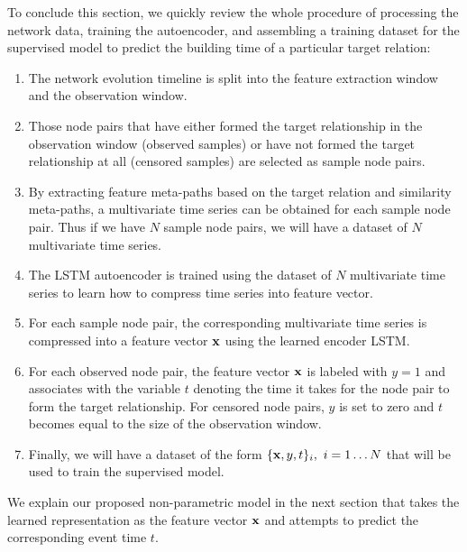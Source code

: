 {\color{red}
To conclude this section, we quickly review the whole procedure of processing the network data, training the autoencoder, and assembling a training dataset for the supervised model to predict the building time of a particular target relation:
\begin{enumerate}%
	\item The network evolution timeline is split into the feature extraction window and the observation window.
	\item Those node pairs that have either formed the target relationship in the observation window (observed samples) or have not formed the target relationship at all (censored samples) are selected as sample node pairs.
	\item By extracting feature meta-paths based on the target relation and similarity meta-paths, a multivariate time series can be obtained for each sample node pair. Thus if we have $N$ sample node pairs, we will have a dataset of $N$ multivariate time series.
	\item The LSTM autoencoder is trained using the dataset of $N$ multivariate time series to learn how to compress time series into feature vector.
	\item For each sample node pair, the corresponding multivariate time series is compressed into a feature vector $\mathbf{x}$ using the learned encoder LSTM. 
	\item For each observed node pair, the feature vector $\mathbf{x}$ is labeled with $y=1$ and associates with the variable $t$ denoting the time it takes for the node pair to form the target relationship. For censored node pairs, $y$ is set to zero and $t$ becomes equal to the size of the observation window.
	\item Finally, we will have a dataset of the form $\{\mathbf{x},y,t\}_i,\ i=1\dots N$ that will be used to train the supervised model.
\end{enumerate}}

We explain our proposed non-parametric model in the next section that takes the learned representation as the feature vector $\mathbf{x}$ and attempts to predict the corresponding event time $t$. 


